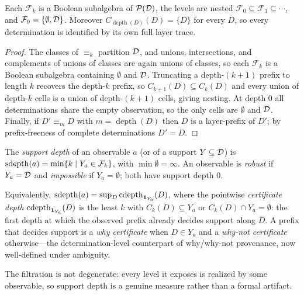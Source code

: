 \begin{proposition}[Filtration]
  \label{prop:filtration}
  Each $\mathcal{F}_k$ is a Boolean subalgebra of $\mathcal{P}(\mathcal{D})$,
  the levels are nested
  $\mathcal{F}_0 \subseteq \mathcal{F}_1 \subseteq \cdots$, and
  $\mathcal{F}_0 = \{\emptyset, \mathcal{D}\}$. Moreover
  $C_{\operatorname{depth}(D)}(D) = \{D\}$ for every $D$, so every
  determination is identified by its own full layer trace.
\end{proposition}
\begin{proof}
  The classes of $\equiv_k$ partition $\mathcal{D}$, and unions, intersections, and
  complements of unions of classes are again unions of classes, so each
  $\mathcal{F}_k$ is a Boolean subalgebra containing $\emptyset$ and $\mathcal{D}$.
  Truncating a depth-$(k{+}1)$ prefix to length $k$ recovers the depth-$k$
  prefix, so $C_{k+1}(D) \subseteq C_k(D)$ and every union of depth-$k$ cells
  is a union of depth-$(k{+}1)$ cells, giving nesting. At depth $0$ all
  determinations share the empty observation, so the only cells are
  $\emptyset$ and $\mathcal{D}$. Finally, if $D' \equiv_{m} D$ with
  $m = \operatorname{depth}(D)$ then $D$ is a layer-prefix of $D'$; by
  prefix-freeness of complete determinations $D' = D$.
\end{proof}

\begin{definition}
  \label{def:sdepth}
  The \emph{support depth} of an observable $a$ (or of a support
  $Y \subseteq \mathcal{D}$) is
  $\operatorname{sdepth}(a) = \min\{k \mid Y_a \in \mathcal{F}_k\}$, with $\min\emptyset =
  \infty$. An observable is \emph{robust} if $Y_a = \mathcal{D}$ and
  \emph{impossible} if $Y_a = \emptyset$; both have support depth $0$.
\end{definition}

\noindent
Equivalently, $\operatorname{sdepth}(a) = \sup_{D} \operatorname{cdepth}_{\mathbf 1_{Y_a}}(D)$, where the
pointwise \emph{certificate depth} $\operatorname{cdepth}_{\mathbf 1_{Y_a}}(D)$ is the least
$k$ with $C_k(D) \subseteq Y_a$ or $C_k(D) \cap Y_a = \emptyset$: the first
depth at which the observed prefix already decides support along $D$. A prefix
that decides support is a \emph{why certificate} when $D \in Y_a$ and a
\emph{why-not certificate} otherwise---the determination-level counterpart of
why/why-not provenance, now well-defined under ambiguity.

The filtration is not degenerate: every level it exposes is realized by some
observable, so support depth is a genuine measure rather than a formal
artifact.

